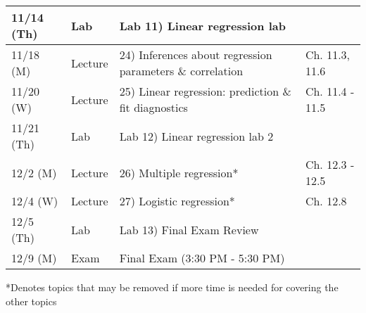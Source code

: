 \documentclass{article}
\begin{document}
\begin{center}
\begin{tabular}{|p{2cm}|p{1.5cm}|p{9cm}|p{2.8cm}|}
		11/14 (Th) & Lab & Lab 11) Linear regression lab & \\ \hline
		11/18 (M) & Lecture & 24) Inferences about regression parameters \& correlation  & Ch. 11.3, 11.6 \\ \hline
		11/20 (W) & Lecture & 25) Linear regression: prediction \& fit diagnostics & Ch. 11.4 - 11.5 \\ \hline
		11/21 (Th) & Lab & Lab 12) Linear regression lab 2 & \\ \hline
		12/2 (M) & Lecture & 26) Multiple regression* & Ch. 12.3 - 12.5\\ \hline
		12/4 (W) & Lecture & 27) Logistic regression* & Ch. 12.8 \\ \hline
		12/5 (Th) & Lab & Lab 13) Final Exam Review & \\ \hline
		12/9 (M) & Exam &  Final Exam (3:30 PM - 5:30 PM) & \\ \hline
	\end{tabular}
\end{center}
*Denotes topics that may be removed if more time is needed for covering the other topics
\end{document}
